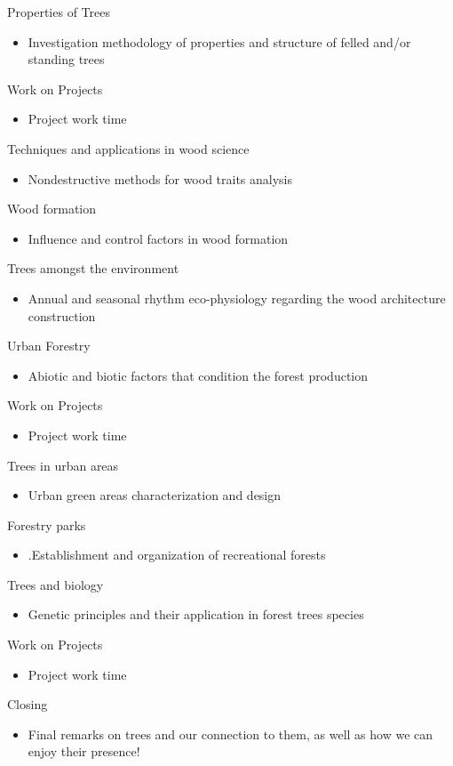 \documentclass[11pt, a4paper]{article}
\begin{document}
 Properties of Trees
\begin{itemize}
\item Investigation methodology of properties and structure of felled and/or standing trees
\end{itemize}

 Work on Projects
\begin{itemize}
\item Project work time
\end{itemize}

 Techniques and applications in wood science
\begin{itemize}
\item Nondestructive methods for wood traits analysis
\end{itemize}

 Wood formation
\begin{itemize}
\item Influence and control factors in wood formation
\end{itemize}

 Trees amongst the environment
\begin{itemize}
\item Annual and seasonal rhythm eco-physiology regarding the wood architecture construction
\end{itemize}

 Urban Forestry
\begin{itemize}
\item Abiotic and biotic factors that condition the forest production
\end{itemize}

 Work on Projects
\begin{itemize}
\item Project work time
\end{itemize}

 Trees in urban areas
\begin{itemize}
\item Urban green areas characterization and design
\end{itemize}

 Forestry parks
\begin{itemize}
\item .Establishment and organization of recreational forests
\end{itemize}

 Trees and biology
\begin{itemize}
\item Genetic principles and their application in forest trees species
\end{itemize}

 Work on Projects
\begin{itemize}
\item Project work time
\end{itemize}

 Closing
\begin{itemize}
\item Final remarks on trees and our connection to them, as well as how we can enjoy their presence! 
\end{itemize}
\end{document}
